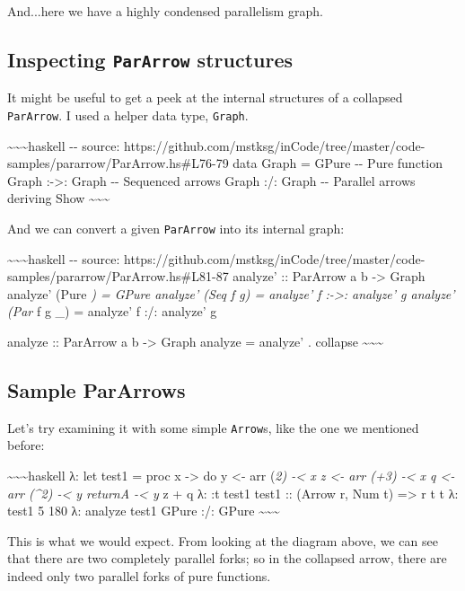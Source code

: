 \documentclass[]{article}
\begin{document}
And...here we have a highly condensed parallelism graph.

\subsection{\texorpdfstring{Inspecting \texttt{ParArrow}
structures}{Inspecting ParArrow structures}}

It might be useful to get a peek at the internal structures of a collapsed
\texttt{ParArrow}. I used a helper data type, \texttt{Graph}.

\textasciitilde{}\textasciitilde{}\textasciitilde{}haskell -\/- source:
https://github.com/mstksg/inCode/tree/master/code-samples/pararrow/ParArrow.hs\#L76-79
data Graph = GPure -\/- Pure function \textbar{} Graph :-\textgreater{}: Graph
-\/- Sequenced arrows \textbar{} Graph :/: Graph -\/- Parallel arrows deriving
Show \textasciitilde{}\textasciitilde{}\textasciitilde{}

And we can convert a given \texttt{ParArrow} into its internal graph:

\textasciitilde{}\textasciitilde{}\textasciitilde{}haskell -\/- source:
https://github.com/mstksg/inCode/tree/master/code-samples/pararrow/ParArrow.hs\#L81-87
analyze' :: ParArrow a b -\textgreater{} Graph analyze' (Pure \emph{) = GPure
analyze' (Seq f g) = analyze' f :-\textgreater{}: analyze' g analyze' (Par } f g
\_) = analyze' f :/: analyze' g

analyze :: ParArrow a b -\textgreater{} Graph analyze = analyze' . collapse
\textasciitilde{}\textasciitilde{}\textasciitilde{}

\subsection{Sample ParArrows}

Let's try examining it with some simple \texttt{Arrow}s, like the one we
mentioned before:

\textasciitilde{}\textasciitilde{}\textasciitilde{}haskell λ: let test1 =
\textbar{} proc x -\textgreater{} do \textbar{} y \textless{}- arr (\emph{2)
-\textless{} x \textbar{} z \textless{}- arr (+3) -\textless{} x \textbar{} q
\textless{}- arr (\^{}2) -\textless{} y \textbar{} returnA -\textless{} y } z +
q λ: :t test1 test1 :: (Arrow r, Num t) =\textgreater{} r t t λ: test1 5 180 λ:
analyze test1 GPure :/: GPure
\textasciitilde{}\textasciitilde{}\textasciitilde{}

This is what we would expect. From looking at the diagram above, we can see that
there are two completely parallel forks; so in the collapsed arrow, there are
indeed only two parallel forks of pure functions.
\end{document}
